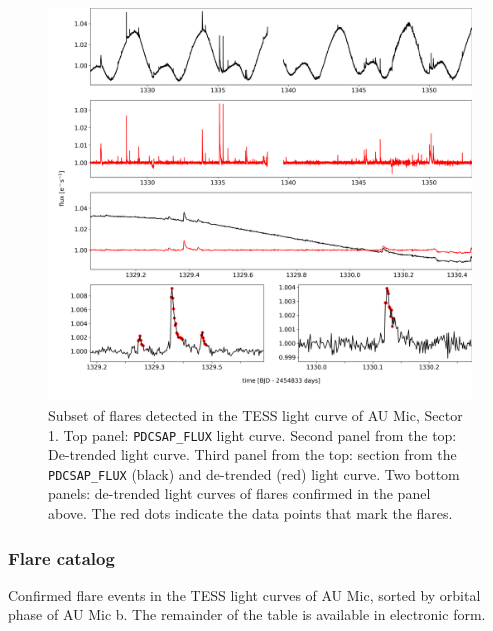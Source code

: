\documentclass[fleqn,usenatbib]{mnras}%
\begin{document}
\begin{figure}
\includegraphics[width=\hsize]{figures/aumic_illustrate_flares.png} 
\caption{Subset of flares detected in the TESS light curve of AU Mic, Sector 1. Top panel: \texttt{PDCSAP\_FLUX} light curve. Second panel from the top: De-trended light curve. Third panel from the top: section from the \texttt{PDCSAP\_FLUX} (black) and de-trended (red) light curve. Two bottom panels: de-trended light curves of flares confirmed in the panel above. The red dots indicate the data points that mark the flares.}
\label{fig:illustrate_detrend}
\end{figure}

\subsubsection{Flare catalog}
\label{sec:flarecatalog}
\begin{table}
\caption{Confirmed flare events in the TESS light curves of AU Mic, sorted by orbital phase of AU Mic b. The remainder of the table is available in electronic form.}
\centering

\label{tab:flares}
\end{table}
\end{document}
